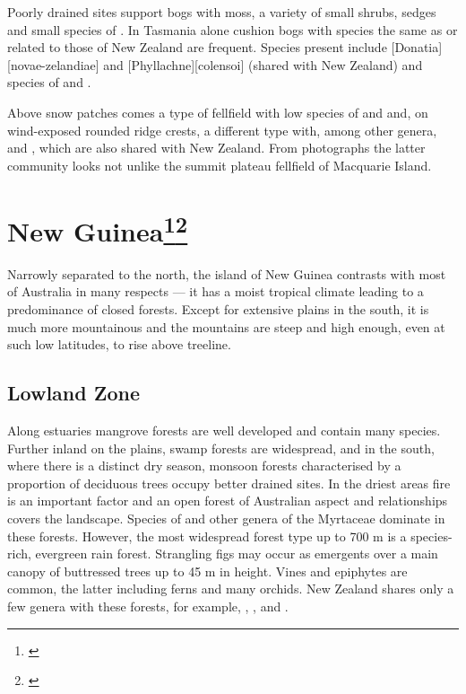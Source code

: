 Poorly drained sites support bogs with  moss, a variety of small shrubs, sedges and small species of .
In Tasmania alone cushion bogs with species the same as or related to those of New Zealand are frequent.
Species present include [Donatia][novae-zelandiae] and [Phyllachne][colensoi] (shared with New Zealand) and species of  and .

Above snow patches comes a type of fellfield with low species of  and  and, on wind-exposed rounded ridge crests, a different type with, among other genera,  and , which are also shared with New Zealand.
From photographs the latter community looks not unlike the summit plateau fellfield of Macquarie Island.

\section[New Guinea]{New Guinea\footnote{\cite{johns1982plant}}\footnote{\cite{wardle1973newguinea}}}

Narrowly separated to the north, the island of New Guinea contrasts with most of Australia in many respects --- it has a moist tropical climate leading to a predominance of closed forests.
Except for extensive plains in the south, it is much more mountainous and the mountains are steep and high enough, even at such low latitudes, to rise above treeline.

\subsection{Lowland Zone}

Along estuaries mangrove forests are well developed and contain many species.
Further inland on the plains, swamp forests are widespread, and in the south, where there is a distinct dry season, monsoon forests characterised by a proportion of deciduous trees occupy better drained sites.
In the driest areas fire is an important factor and an open forest of Australian aspect and relationships covers the landscape.
Species of  and other genera of the Myrtaceae dominate in these forests.
However, the most widespread forest type up to 700 m is a species-rich, evergreen rain forest.
Strangling figs may occur as emergents over a main canopy of buttressed trees up to 45 m in height.
Vines and epiphytes are common, the latter including ferns and many orchids.
New Zealand shares only a few genera with these forests, for example, , ,  and .

